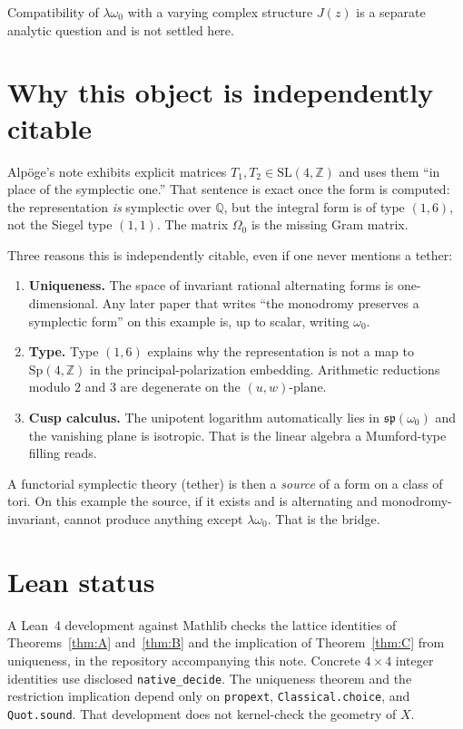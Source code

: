 \documentclass[11pt,a4paper]{article}
\theoremstyle{definition}
\theoremstyle{remark}
\newcommand{\Q}{\mathbb{Q}}
\newcommand{\Z}{\mathbb{Z}}
\newcommand{\spq}{\mathfrak{sp}}
\begin{document}
Compatibility of $\lambda\omega_0$ with a varying complex structure $J(z)$ is a separate analytic question and is not settled here.

\section{Why this object is independently citable}

Alp\"oge's note exhibits explicit matrices $T_1,T_2\in\mathrm{SL}(4,\Z)$ and uses them ``in place of the symplectic one.'' That sentence is exact once the form is computed: the representation \emph{is} symplectic over $\Q$, but the integral form is of type $(1,6)$, not the Siegel type $(1,1)$. The matrix $\Omega_0$ is the missing Gram matrix.

Three reasons this is independently citable, even if one never mentions a tether:

\begin{enumerate}
\item \textbf{Uniqueness.} The space of invariant rational alternating forms is one-dimensional. Any later paper that writes ``the monodromy preserves a symplectic form'' on this example is, up to scalar, writing $\omega_0$.
\item \textbf{Type.} Type $(1,6)$ explains why the representation is not a map to $\mathrm{Sp}(4,\Z)$ in the principal-polarization embedding. Arithmetic reductions modulo $2$ and $3$ are degenerate on the $(u,w)$-plane.
\item \textbf{Cusp calculus.} The unipotent logarithm automatically lies in $\spq(\omega_0)$ and the vanishing plane is isotropic. That is the linear algebra a Mumford-type filling reads.
\end{enumerate}

A functorial symplectic theory (tether) is then a \emph{source} of a form on a class of tori. On this example the source, if it exists and is alternating and monodromy-invariant, cannot produce anything except $\lambda\omega_0$. That is the bridge.

\section{Lean status}

A Lean~4 development against Mathlib checks the lattice identities of Theorems~\ref{thm:A} and~\ref{thm:B} and the implication of Theorem~\ref{thm:C} from uniqueness, in the repository accompanying this note. Concrete $4\times 4$ integer identities use disclosed \texttt{native\_decide}. The uniqueness theorem and the restriction implication depend only on \texttt{propext}, \texttt{Classical.choice}, and \texttt{Quot.sound}. That development does not kernel-check the geometry of $X$.
\end{document}
